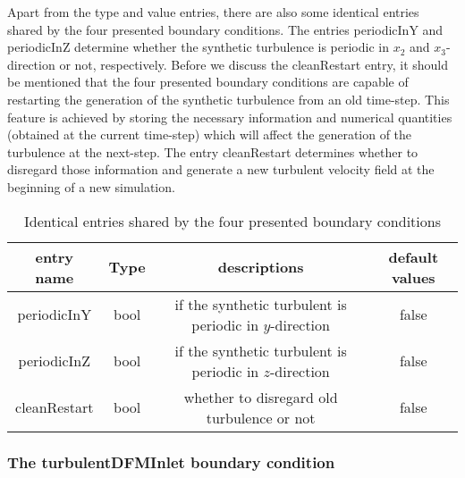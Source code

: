 Apart from the \textcolor{mauve}{type} and \textcolor{mauve}{value} entries, there are also some identical entries shared by the four presented boundary conditions. The entries \textcolor{mauve}{periodicInY} and \textcolor{mauve}{periodicInZ} determine whether the synthetic turbulence is periodic in $x_2$ and $x_3$-direction or not, respectively. Before we discuss the \textcolor{mauve}{cleanRestart} entry, it should be mentioned that the four presented boundary conditions are capable of restarting the generation of the synthetic turbulence from an old time-step. This feature is achieved by storing the necessary information and numerical quantities (obtained at the current time-step) which will affect the generation of the turbulence at the next-step. The entry \textcolor{mauve}{cleanRestart} determines whether to disregard those information and generate a new turbulent velocity field at the beginning of a new simulation.

\begin{table}[H]
\centering
\begin{tabular}{c|c|c|c}
\hline
entry name & Type & descriptions & default values \\
\hline
\textcolor{mauve}{periodicInY} & bool & if the synthetic turbulent is periodic in $y$-direction & false \\
\hline
\textcolor{mauve}{periodicInZ} & bool & if the synthetic turbulent is periodic in $z$-direction & false \\
\hline
\textcolor{mauve}{cleanRestart} & bool & whether to disregard old turbulence or not & false \\
\hline
\end{tabular} \caption{Identical entries shared by the four presented boundary conditions}\label{entryIdentical}
\end{table}


\subsubsection{The \textcolor{mauve}{turbulentDFMInlet} boundary condition}

